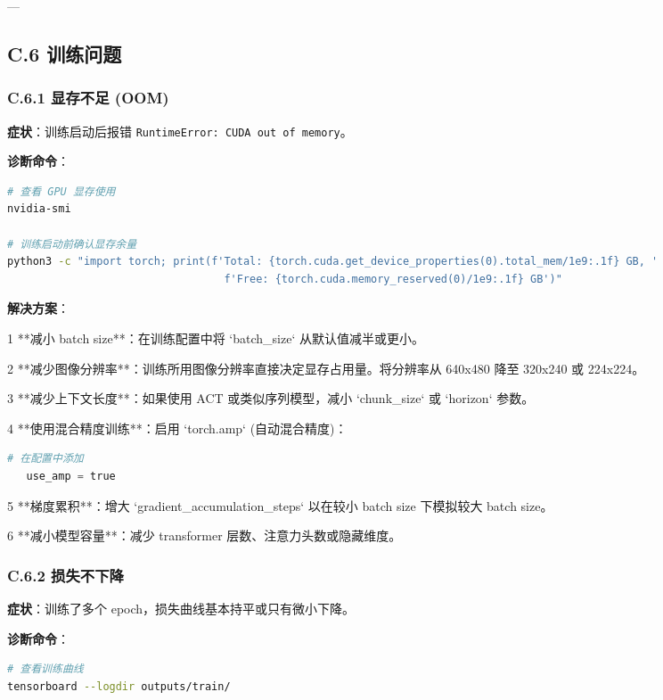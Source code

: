 \documentclass[UTF8,a4paper,11pt]{ctexart}
\begin{document}
{---

\subsection{C.6 训练问题}

\subsubsection{C.6.1 显存不足 (OOM)}

\textbf{症状}：训练启动后报错 \texttt{RuntimeError: CUDA out of memory}。

\textbf{诊断命令}：
\begin{lstlisting}[language=bash]
# 查看 GPU 显存使用
nvidia-smi

# 训练启动前确认显存余量
python3 -c "import torch; print(f'Total: {torch.cuda.get_device_properties(0).total_mem/1e9:.1f} GB, '
                                  f'Free: {torch.cuda.memory_reserved(0)/1e9:.1f} GB')"
\end{lstlisting}

\textbf{解决方案}：
\item[1] **减小 batch size**：在训练配置中将 `batch_size` 从默认值减半或更小。
\item[2] **减少图像分辨率**：训练所用图像分辨率直接决定显存占用量。将分辨率从 640x480 降至 320x240 或 224x224。
\item[3] **减少上下文长度**：如果使用 ACT 或类似序列模型，减小 `chunk_size` 或 `horizon` 参数。
\item[4] **使用混合精度训练**：启用 `torch.amp` (自动混合精度)：
\begin{lstlisting}[language=python]
   # 在配置中添加
   use_amp = true
\end{lstlisting}
\item[5] **梯度累积**：增大 `gradient_accumulation_steps` 以在较小 batch size 下模拟较大 batch size。
\item[6] **减小模型容量**：减少 transformer 层数、注意力头数或隐藏维度。

\subsubsection{C.6.2 损失不下降}

\textbf{症状}：训练了多个 epoch，损失曲线基本持平或只有微小下降。

\textbf{诊断命令}：
\begin{lstlisting}[language=bash]
# 查看训练曲线
tensorboard --logdir outputs/train/


\end{lstlisting}}
\end{document}
